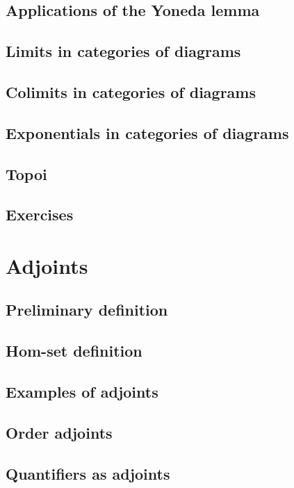 \documentclass[uplatex, 12pt, dvipdfmx]{jsarticle}
\begin{document}
\subsection{Applications of the Yoneda lemma}

\subsection{Limits in categories of diagrams}

\subsection{Colimits in categories of diagrams}

\subsection{Exponentials in categories of diagrams}

\subsection{Topoi}

\subsection{Exercises}

\section{Adjoints}

\subsection{Preliminary definition}

\subsection{Hom-set definition}

\subsection{Examples of adjoints}

\subsection{Order adjoints}

\subsection{Quantifiers as adjoints}
\end{document}
